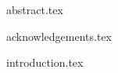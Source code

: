 \documentclass{bris}
\begin{document}

\maketitle

\frontmatter

\makedecl

{abstract.tex}

{acknowledgements.tex}

\tableofcontents
{}
\listoffigures
{}
\listoftables
{}
\listofalgorithms
\lstlistoflistings

\mainmatter

{introduction.tex}
\end{document}
